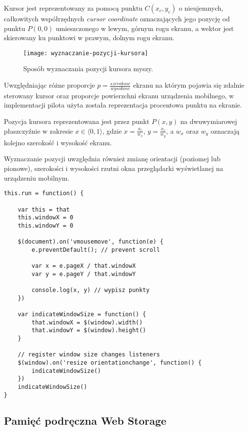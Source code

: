 Kursor jest reprezentowany za pomocą punktu \(C(x_{c}, y_{c})\) o nieujemnych, całkowitych współrzędnych \emph{cursor coordinate} oznaczających jego pozycję od punktu \(P(0, 0)\) umieszczonego w lewym, górnym rogu ekranu, a wektor jest skierowany ku punktowi w prawym, dolnym rogu ekranu.

\begin{figure}[h!]
  \caption{Sposób wyznaczania pozycji kursora myszy.}
  \centering
    \texttt{[image: wyznaczanie-pozycji-kursora]}
\end{figure}

Uwzględniając różne proporcje \(p = \frac{szerokosc}{wysokosc}\) ekranu na którym pojawia się zdalnie sterowany kursor oraz proporcje powierzchni ekranu urządzenia mobilnego, w implementacji pilota użyta została reprezentacja procentowa punktu na ekranie.

Pozycja kursora reprezentowana jest przez punkt \(P(x, y)\) na dwuwymiarowej płaszczyźnie w zakresie \( x\in \langle0, 1\rangle \), gdzie \(x = \frac{x_{c}}{w_{x}}\), \(y = \frac{x_{c}}{w_{y}}\), a \(w_{x}\) oraz \(w_{y}\) oznaczają kolejno szerokość i wysokość ekranu.

Wyznaczanie pozycji uwzględnia również zmianę orientacji (poziomej lub pionowe), szerokości i wysokości rzutni okna przeglądarki wyświetlanej na urządzeniu mobilnym.

\lstset{language=JavaScript}
\begin{lstlisting}
this.run = function() {
	
	var this = that
	this.windowX = 0
	this.windowY = 0
	
	$(document).on('vmousemove', function(e) {
		e.preventDefault(); // prevent scroll
		
		var x = e.pageX / that.windowX
		var y = e.pageY / that.windowY
		
		console.log(x, y) // wypisz punkty
	})
	
	var indicateWindowSize = function() {
		that.windowX = $(window).width()
		that.windowY = $(window).height()
	}
	
	// register window size changes listeners
	$(window).on('resize orientationchange', function() {
		indicateWindowSize()
	})
	indicateWindowSize()
}
\end{lstlisting}

\subsection{Pamięć podręczna Web Storage}

